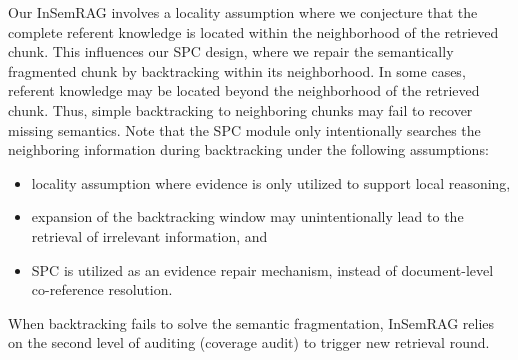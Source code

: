 Our InSemRAG involves a locality assumption where we conjecture that the complete referent knowledge is located within the neighborhood of the retrieved chunk.
This influences our SPC design, where we repair the semantically fragmented chunk by backtracking within its neighborhood.
In some cases, referent knowledge may be located beyond the neighborhood of the retrieved chunk.
Thus, simple backtracking to neighboring chunks may fail to recover missing semantics.
Note that the SPC module only intentionally searches the neighboring information during backtracking under the following assumptions:
\begin{itemize}
    \item locality assumption where evidence is only utilized to support local reasoning,
    \item expansion of the backtracking window may unintentionally lead to the retrieval of irrelevant information, and
    \item SPC is utilized as an evidence repair mechanism, instead of document-level co-reference resolution.
\end{itemize}
When backtracking fails to solve the semantic fragmentation, InSemRAG relies on the second level of auditing (coverage audit) to trigger new retrieval round.